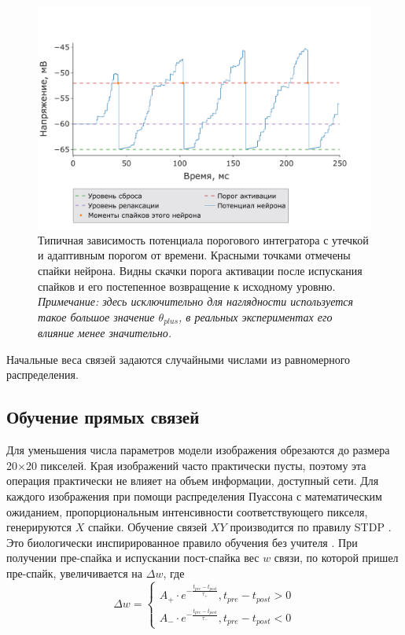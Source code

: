 \documentclass[a4paper]{article}
\begin{document}
\begin{center}
\begin{figure}[H]
 \includegraphics[width=\textwidth,keepaspectratio=true]{model_alif_ru.pdf}
 \caption{Типичная зависимость потенциала порогового интегратора с утечкой и адаптивным порогом от времени. Красными точками отмечены спайки нейрона. Видны скачки порога активации после испускания спайков и его постепенное возвращение к исходному уровню.\\
 \textit{Примечание: здесь исключительно для наглядности используется такое большое значение $\theta_{plus}$, в реальных экспериментах его влияние менее значительно.}}
\end{figure} 
\end{center}

Начальные веса связей задаются случайными числами из равномерного распределения.

\subsection{Обучение прямых связей}
Для уменьшения числа параметров модели изображения обрезаются до размера 20$\times$20 пикселей. Края изображений часто практически пусты, поэтому эта операция практически не влияет на объем информации, доступный сети. Для каждого изображения при помощи распределения Пуассона с математическим ожиданием, пропорциональным интенсивности соответствующего пикселя, генерируются $X$ спайки. Обучение связей $XY$ производится по правилу STDP \cite{STDP}. Это биологически инспирированное правило обучения без учителя \cite{STDP}. При получении пре-спайка и испускании пост-спайка вес $w$ связи, по которой пришел пре-спайк, увеличивается на $\Delta w$, где
\begin{equation} 
\Delta w =
 \begin{cases}
 A_+ \cdot e^{- \frac{t_{pre} - t_{post}}{\tau_+}}, t_{pre} - t_{post} > 0\\
 A_- \cdot e^{- \frac{t_{pre} - t_{post}}{\tau_-}}, t_{pre} - t_{post} < 0
 \end{cases}
\end{equation}
\end{document}
